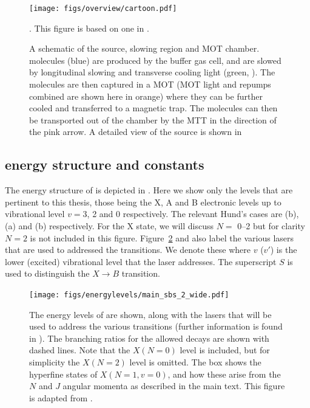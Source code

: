 \begin{figure}
  \centering
  \texttt{[image: figs/overview/cartoon.pdf]}
  \caption{A schematic of the \CaF{} source, slowing region and MOT chamber.
  \CaF{} molecules (blue) are produced by the buffer gas cell, and are
  slowed by longitudinal slowing and transverse cooling light (green,
  ). The molecules are then captured in a MOT (MOT light
   and repumps combined are shown here in orange) where
  they can be further cooled and transferred to a magnetic trap. The molecules
  can then be transported out of the chamber by the MTT in the direction of the
  pink arrow. A detailed view of the source is shown in
  }. This figure is based on one in
  .
  \label{overview:fig:CaFcartoon}
\end{figure}

\subsection{\CaF{} energy structure and constants}

The energy structure of \CaF{} is depicted in
. Here we show only the levels that are
pertinent to this thesis, those being the X, A and B electronic levels up to
vibrational level $v=3$, 2 and 0 respectively. The relevant Hund's cases are
(b), (a) and (b) respectively. For the X state, we will discuss $N=$
\numrange{0}{2} but for clarity $N=2$ is not included in this figure.
%
Figure~\ref{overview:fig:CaFenergy} and  also
label the various lasers that are used to addressed the \CaF{} transitions. We
denote these  where $v$ ($v'$) is the lower (excited)
vibrational level that the laser addresses. The superscript $S$ is used to
distinguish the $X\rightarrow B$ transition.

\begin{figure}
  \centering
  \texttt{[image: figs/energylevels/main\_sbs\_2\_wide.pdf]}
  \caption{
    The energy levels of \CaF{} are shown, along with the lasers that will be
    used to address the various transitions (further information is found in
    ). The branching ratios for the allowed
    decays are shown with dashed lines. Note that the $X(N=0)$ level is
    included, but for simplicity the $X(N=2)$ level is omitted. The box shows
    the hyperfine states of $X(N=1, v=0)$, and how these arise from the $N$ and
    $J$ angular momenta as described in the main text. This figure is adapted from
    . 
  }
  \label{overview:fig:CaFenergy}
\end{figure}

